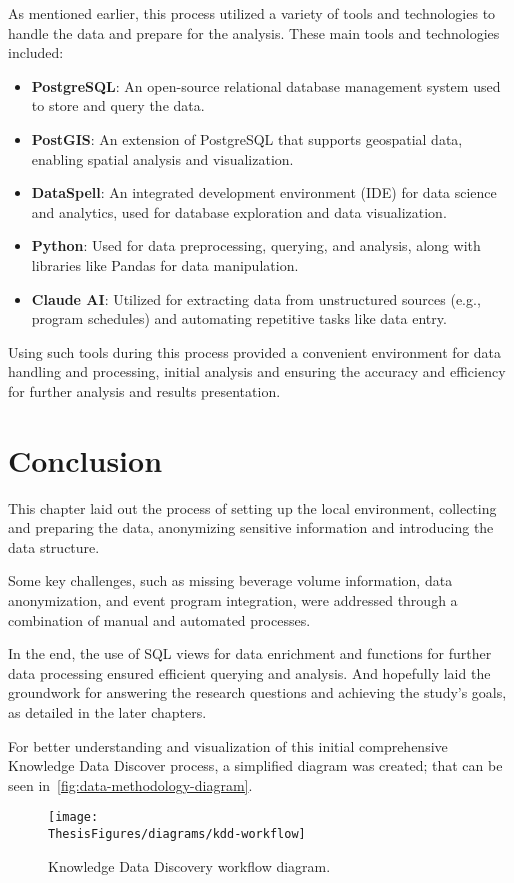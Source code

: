 As mentioned earlier, this process utilized a variety of tools and technologies to handle the data and prepare for the analysis.
These main tools and technologies included:
\begin{itemize}
	\item \textbf{PostgreSQL}: An open-source relational database management system used to store and query the data.
	\item \textbf{PostGIS}: An extension of PostgreSQL that supports geospatial data, enabling spatial analysis and visualization.
	\item \textbf{DataSpell}: An integrated development environment (IDE) for data science and analytics, used for database exploration and data visualization.
	\item \textbf{Python}: Used for data preprocessing, querying, and analysis, along with libraries like Pandas for data manipulation.
	\item \textbf{Claude AI}: Utilized for extracting data from unstructured sources (e.g., program schedules) and automating repetitive tasks like data entry.
\end{itemize}

Using such tools during this process provided a convenient environment for data handling and processing, initial analysis and ensuring the accuracy and efficiency for further analysis and results presentation.


\section{Conclusion}
\label{sec:data-methodology-conclusion}
This chapter laid out the process of setting up the local environment, collecting and preparing the data, anonymizing sensitive information and introducing the data structure.

Some key challenges, such as missing beverage volume information, data anonymization, and event program integration, were addressed through a combination of manual and automated processes.

In the end, the use of SQL views for data enrichment and functions for further data processing ensured efficient querying and analysis.
And hopefully laid the groundwork for answering the research questions and achieving the study's goals, as detailed in the later chapters.

For better understanding and visualization of this initial comprehensive Knowledge Data Discover process, a simplified diagram was created; that can be seen in~\autoref{fig:data-methodology-diagram}.

\begin{figure}[H]
	\centering
	\texttt{[image: \\ThesisFigures/diagrams/kdd-workflow]}
	\caption{Knowledge Data Discovery workflow diagram.}
	\label{fig:data-methodology-diagram}
\end{figure}

